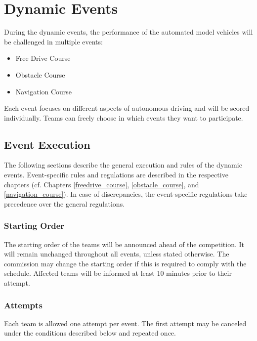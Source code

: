 \chapter{Dynamic Events}
\label{events}

During the dynamic events, the performance of the automated model vehicles will be challenged in multiple events:

\begin{itemize}
    \item Free Drive Course
    \item Obstacle Course
    \item Navigation Course
\end{itemize}

Each event focuses on different aspects of autonomous driving and will be scored individually.
Teams can freely choose in which events they want to participate.

\section{Event Execution}

The following sections describe the general execution and rules of the dynamic events.
Event-specific rules and regulations are described in the respective chapters (cf. Chapters \ref{freedrive_course}, \ref{obstacle_course}, and \ref{navigation_course}).
In case of discrepancies, the event-specific regulations take precedence over the general regulations.

\subsection{Starting Order}
\label{starting_order}

The starting order of the teams will be announced ahead of the competition.
It will remain unchanged throughout all events, unless stated otherwise.
The commission may change the starting order if this is required to comply with the schedule.
Affected teams will be informed at least 10 minutes prior to their attempt.

\subsection{Attempts}
\label{attempts}

Each team is allowed one attempt per event. The first attempt may be canceled
under the conditions described below and repeated once.


